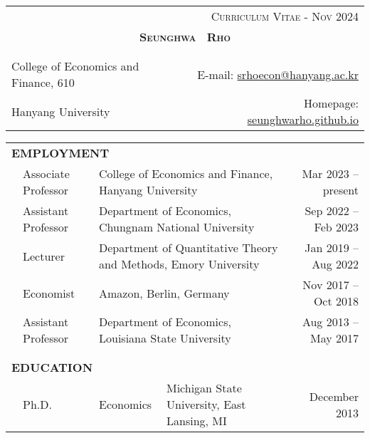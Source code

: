 \documentclass[10pt]{article}
\begin{document}
\begin{center}
\begin{tabular}{lr}
& \textsc{Curriculum Vitae - Nov 2024} \\
\multicolumn{2}{c}{{\Large \textsc{\textbf{Seunghwa \ Rho }}}}\\ 
\multicolumn{2}{p{510pt}}{}\\
\hline\\
College of Economics and Finance, 610 & E-mail: \href{mailto:srhoecon@hanyang.ac.kr}{srhoecon@hanyang.ac.kr} \\
\multicolumn{1}{l}{Hanyang University}&Homepage: \href{https://seunghwarho.github.io}{seunghwarho.github.io}
\end{tabular}

\bigskip \bigskip \bigskip 
\begin{tabular}{llllr}
\multicolumn{5}{l}{{\Large \textbf{E}}\textbf{MPLOYMENT}} \vspace{0.1cm}\\
&\multicolumn{1}{l}{Associate Professor} & \multicolumn{2}{l}{College of Economics and Finance, Hanyang University}& \multicolumn{1}{r}{Mar 2023 -- present}\vspace{0.1cm} \\
&\multicolumn{1}{l}{Assistant Professor} & \multicolumn{2}{l}{Department of Economics, Chungnam National University}& \multicolumn{1}{r}{Sep 2022 -- Feb 2023}\vspace{0.1cm} \\
&\multicolumn{1}{l}{Lecturer} & \multicolumn{2}{l}{Department of Quantitative Theory and Methods, Emory University}& \multicolumn{1}{r}{Jan 2019 -- Aug 2022}\vspace{0.1cm} \\
&\multicolumn{1}{l}{Economist} & \multicolumn{2}{l}{Amazon, Berlin, Germany}& \multicolumn{1}{r}{Nov 2017 -- Oct 2018}\vspace{0.1cm} \\
&\multicolumn{1}{l}{Assistant Professor} &\multicolumn{2}{l}{Department of Economics, Louisiana State University}& \multicolumn{1}{r}{Aug 2013 -- May 2017} \\
\multicolumn{5}{p{460pt}}{}\\\\
\multicolumn{5}{l}{{\Large \textbf{E}}\textbf{DUCATION}} \vspace{0.1cm}\\
&\multicolumn{1}{l}{Ph.D.} & \multicolumn{1}{l}{Economics}&\multicolumn{1}{l}{Michigan State University, East Lansing, MI}& \multicolumn{1}{r}{December 2013} \\

\end{tabular}
\end{center}
\end{document}
